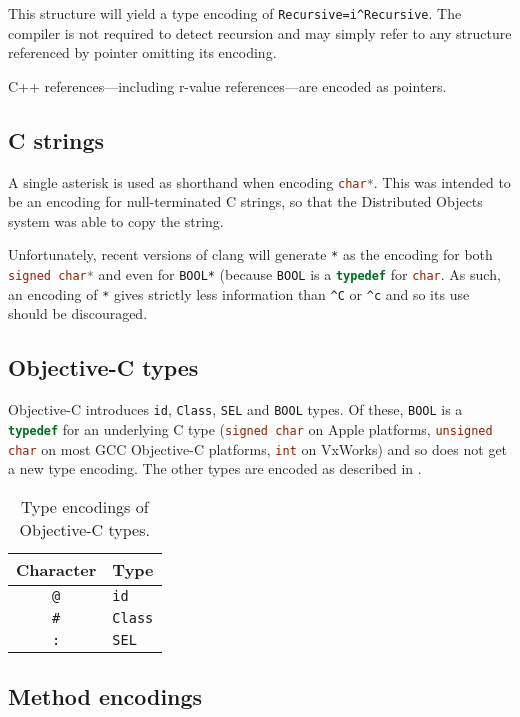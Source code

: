 \documentclass[a4paper]{report}
\newcommand{\ccode}[1]{\lstinline[language={C}]{#1}}
\newcommand{\objc}[1]{\lstinline[language={[Objective]C}]{#1}}
\begin{document}
This structure will yield a type encoding of \texttt{{Recursive=i\^{}{Recursive}}}.
The compiler is not required to detect recursion and may simply refer to any structure referenced by pointer omitting its encoding.

C++ references---including r-value references---are encoded as pointers.

\subsection{C strings}

A single asterisk is used as shorthand when encoding \ccode{char*}.
This was intended to be an encoding for null-terminated C strings, so that the Distributed Objects system was able to copy the string.

Unfortunately, recent versions of clang will generate \texttt{*} as the encoding for both \ccode{signed char*} and even for \objc{BOOL*} (because \objc{BOOL} is a \ccode{typedef} for \ccode{char}.
As such, an encoding of \texttt{*} gives strictly less information than \texttt{\^{}C} or \texttt{\^{}c} and so its use should be discouraged.

\subsection{Objective-C types}

Objective-C introduces \objc{id}, \objc{Class}, \objc{SEL} and \objc{BOOL} types.
Of these, \objc{BOOL} is a \ccode{typedef} for an underlying C type (\ccode{signed char} on Apple platforms, \ccode{unsigned char} on most GCC Objective-C platforms, \ccode{int} on VxWorks) and so does not get a new type encoding.
The other types are encoded as described in .

\begin{table}
	\begin{center}
		\begin{tabular}{c|l}
			Character   & Type\\\hline
			\texttt{@}  & \objc{id} \\
			\texttt{\#} & \objc{Class} \\
			\texttt{:}  & \objc{SEL}
		\end{tabular}
		\caption{\label{tab:objcencode}Type encodings of Objective-C types.}
	\end{center}
\end{table}


\subsection{Method encodings}
\end{document}
